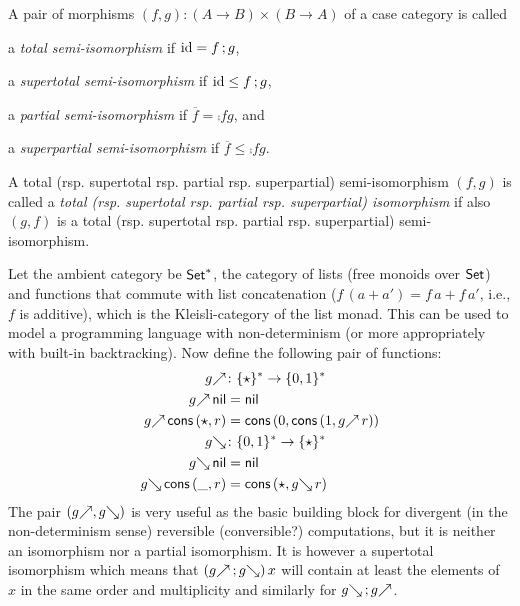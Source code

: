 \documentclass[runningheads,envcountsame]{llncs}
\begin{document}
\begin{definition} \label{def:semiiso}
    A pair of morphisms $(f, g)\colon (A \to B) \times (B \to A)$ of a case category is called 
    \begin{definitionlist}
        \item \label{def:total-semiiso} a \emph{total semi-isomorphism} if $\id = \comp{f}{g}$,
        \item \label{def:supertotal-semiiso} a \emph{supertotal semi-isomorphism} if $\id \leq \comp{f}{g}$,
        \item \label{def:partial-semiiso} a \emph{partial semi-isomorphism} if $\overline{f} = \comp{f}{g}$, and
        \item \label{def:superpartial-semiiso} a \emph{superpartial semi-isomorphism} if $\overline{f} \leq \comp{f}{g}$.
    \end{definitionlist}
    
    A total (rsp. supertotal rsp. partial rsp. superpartial) semi-isomorphism $(f, g)$ is called a \emph{total (rsp. supertotal rsp. partial rsp. superpartial) isomorphism} if also $(g, f)$ is a total (rsp. supertotal rsp. partial rsp. superpartial) semi-isomorphism.
\end{definition}

\begin{example}
    Let the ambient category be $\mathsf{Set}^*$, the category of lists (free monoids over $\mathsf{Set}$) and functions that commute with list concatenation ($f\,(a + a') = f\,a + f\,a'$, i.e., $f$ is additive), which is the Kleisli-category of the list monad. This can be used to model a programming language with non-determinism (or more appropriately with built-in backtracking). Now define the following pair of functions:
    \begin{align}
        \f{g} &\colon \{\star\}^* \to \{0, 1\}^* \\
        \f{g}\,\enil &= \enil \\
        \f{g}\,\econs\,(\star, r) &= \econs\,(0, \econs\,(1, \f{g}\,r)) \\
        \b{g} &\colon \{0, 1\}^* \to \{\star\}^* \\
        \b{g}\,\enil &= \enil \\
        \b{g}\,\econs\,(\_, r) &= \econs\,(\star, \b{g}\,r)
    \end{align}
    The pair $(\f{g}, \b{g})$ is very useful as the basic building block for divergent (in the non-determinism sense) reversible (conversible?) computations, but it is neither an isomorphism nor a partial isomorphism. It is however a supertotal isomorphism which means that $(\comp{\f{g}}{\b{g}})\,x$ will contain at least the elements of $x$ in the same order and multiplicity and similarly for $\comp{\b{g}}{\f{g}}$.
\end{example}
\end{document}
